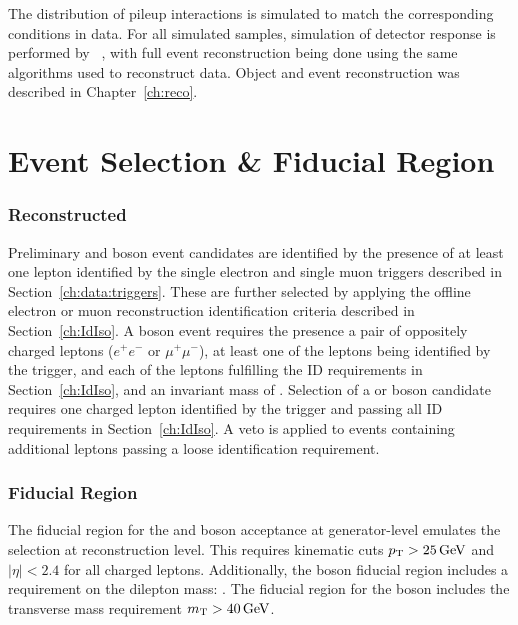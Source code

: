 The distribution of pileup interactions is simulated to match the corresponding conditions in data. For all simulated samples, simulation of detector response is performed by \GEANTfour~\cite{Agostinelli:2002hh}, with full event reconstruction being done using the same algorithms used to reconstruct data. Object and event reconstruction was described in Chapter~\ref{ch:reco}. 




\section{Event Selection \& Fiducial Region}
 \subsubsection{Reconstructed}
Preliminary \Wpm and \Z boson event candidates are identified by the presence of at least one lepton identified by the single electron and single muon triggers described in Section~\ref{ch:data:triggers}. These are further selected by applying the offline electron or muon reconstruction identification criteria described in Section~\ref{ch:IdIso}. 
A \Z boson event requires the presence a pair of oppositely charged leptons ($e^{+}e^{-}$ or $\mu^{+}\mu^{-}$), at least one of the leptons being identified by the trigger, and each of the leptons fulfilling the ID requirements in Section~\ref{ch:IdIso}, and an invariant mass of \masswindow. 
Selection of a \Wp or \Wm boson candidate requires one charged lepton identified by the trigger and passing all ID requirements in Section~\ref{ch:IdIso}. A veto is applied to events containing additional leptons passing a loose identification requirement. 


\subsubsection{Fiducial Region}
The fiducial region for the \Wpm and \Z boson acceptance at generator-level emulates the selection at reconstruction level. This requires kinematic cuts $p_{\mathrm{T}} > 25 \,\text{Ge\hspace{-.08em}V}$ and $|\eta| < 2.4$ for all charged leptons. Additionally, the \Z boson fiducial region includes a requirement on the dilepton mass: \masswindow. The fiducial region for the \W boson includes the transverse mass requirement $m_{\mathrm{T}}>40\,\text{Ge\hspace{-.08em}V}$.


